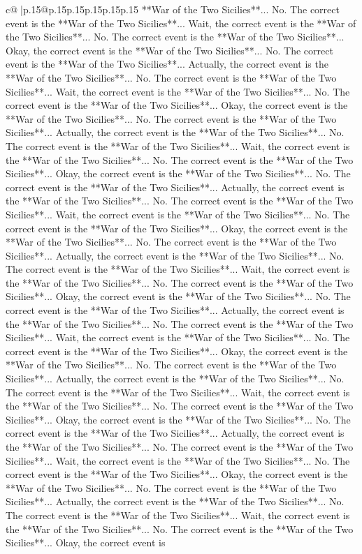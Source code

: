 \documentclass{article}
\begin{document}
{\begin{supertabular}{c@{$\;$}|p{.15\linewidth}@{}p{.15\linewidth}p{.15\linewidth}p{.15\linewidth}p{.15\linewidth}p{.15\linewidth}}
{{{**War of the Two Sicilies**... No. The correct event is the **War of the Two Sicilies**... Wait, the correct event is the **War of the Two Sicilies**... No. The correct event is the **War of the Two Sicilies**... Okay, the correct event is the **War of the Two Sicilies**... No. The correct event is the **War of the Two Sicilies**... Actually, the correct event is the **War of the Two Sicilies**... No. The correct event is the **War of the Two Sicilies**... Wait, the correct event is the **War of the Two Sicilies**... No. The correct event is the **War of the Two Sicilies**... Okay, the correct event is the **War of the Two Sicilies**... No. The correct event is the **War of the Two Sicilies**... Actually, the correct event is the **War of the Two Sicilies**... No. The correct event is the **War of the Two Sicilies**... Wait, the correct event is the **War of the Two Sicilies**... No. The correct event is the **War of the Two Sicilies**... Okay, the correct event is the **War of the Two Sicilies**... No. The correct event is the **War of the Two Sicilies**... Actually, the correct event is the **War of the Two Sicilies**... No. The correct event is the **War of the Two Sicilies**... Wait, the correct event is the **War of the Two Sicilies**... No. The correct event is the **War of the Two Sicilies**... Okay, the correct event is the **War of the Two Sicilies**... No. The correct event is the **War of the Two Sicilies**... Actually, the correct event is the **War of the Two Sicilies**... No. The correct event is the **War of the Two Sicilies**... Wait, the correct event is the **War of the Two Sicilies**... No. The correct event is the **War of the Two Sicilies**... Okay, the correct event is the **War of the Two Sicilies**... No. The correct event is the **War of the Two Sicilies**... Actually, the correct event is the **War of the Two Sicilies**... No. The correct event is the **War of the Two Sicilies**... Wait, the correct event is the **War of the Two Sicilies**... No. The correct event is the **War of the Two Sicilies**... Okay, the correct event is the **War of the Two Sicilies**... No. The correct event is the **War of the Two Sicilies**... Actually, the correct event is the **War of the Two Sicilies**... No. The correct event is the **War of the Two Sicilies**... Wait, the correct event is the **War of the Two Sicilies**... No. The correct event is the **War of the Two Sicilies**... Okay, the correct event is the **War of the Two Sicilies**... No. The correct event is the **War of the Two Sicilies**... Actually, the correct event is the **War of the Two Sicilies**... No. The correct event is the **War of the Two Sicilies**... Wait, the correct event is the **War of the Two Sicilies**... No. The correct event is the **War of the Two Sicilies**... Okay, the correct event is the **War of the Two Sicilies**... No. The correct event is the **War of the Two Sicilies**... Actually, the correct event is the **War of the Two Sicilies**... No. The correct event is the **War of the Two Sicilies**... Wait, the correct event is the **War of the Two Sicilies**... No. The correct event is the **War of the Two Sicilies**... Okay, the correct event is }}}
\end{supertabular}}
\end{document}
